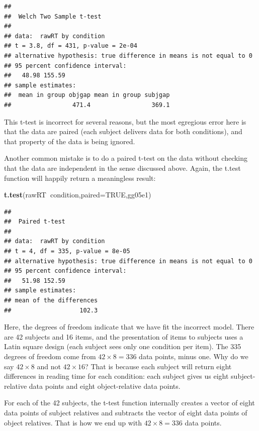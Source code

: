 \documentclass[12pt,]{krantz}
\newenvironment{Shaded}{\begin{snugshade}}{\end{snugshade}}
\newcommand{\DataTypeTok}[1]{\textcolor[rgb]{0.13,0.29,0.53}{#1}}
\newcommand{\KeywordTok}[1]{\textcolor[rgb]{0.13,0.29,0.53}{\textbf{#1}}}
\newcommand{\NormalTok}[1]{#1}
\newcommand{\OperatorTok}[1]{\textcolor[rgb]{0.81,0.36,0.00}{\textbf{#1}}}
\newcommand{\OtherTok}[1]{\textcolor[rgb]{0.56,0.35,0.01}{#1}}
\begin{document}
\begin{verbatim}
## 
##  Welch Two Sample t-test
## 
## data:  rawRT by condition
## t = 3.8, df = 431, p-value = 2e-04
## alternative hypothesis: true difference in means is not equal to 0
## 95 percent confidence interval:
##   48.98 155.59
## sample estimates:
##  mean in group objgap mean in group subjgap 
##                 471.4                 369.1
\end{verbatim}

This t-test is incorrect for several reasons, but the most egregious error here is that the data are paired (each subject delivers data for both conditions), and that property of the data is being ignored.

Another common mistake is to do a paired t-test on the data without checking that the data are independent in the sense discussed above. Again, the t.test function will happily return a meaningless result:

\begin{Shaded}
\begin{Highlighting}[]
\KeywordTok{t.test}\NormalTok{(rawRT}\OperatorTok{~}\NormalTok{condition,}\DataTypeTok{paired=}\OtherTok{TRUE}\NormalTok{,gg05e1)}
\end{Highlighting}
\end{Shaded}

\begin{verbatim}
## 
##  Paired t-test
## 
## data:  rawRT by condition
## t = 4, df = 335, p-value = 8e-05
## alternative hypothesis: true difference in means is not equal to 0
## 95 percent confidence interval:
##   51.98 152.59
## sample estimates:
## mean of the differences 
##                   102.3
\end{verbatim}

Here, the degrees of freedom indicate that we have fit the incorrect model. There are 42 subjects and 16 items, and the presentation of items to subjects uses a Latin square design (each subject sees only one condition per item). The 335 degrees of freedom come from \(42\times 8=336\) data points, minus one. Why do we say \(42\times 8\) and not \(42\times 16\)? That is because each subject will return eight differences in reading time for each condition: each subject gives us eight subject-relative data points and eight object-relative data points.

For each of the 42 subjects, the t-test function internally creates a vector of eight data points of subject relatives and subtracts the vector of eight data points of object relatives. That is how we end up with \(42\times 8=336\) data points.
\end{document}
